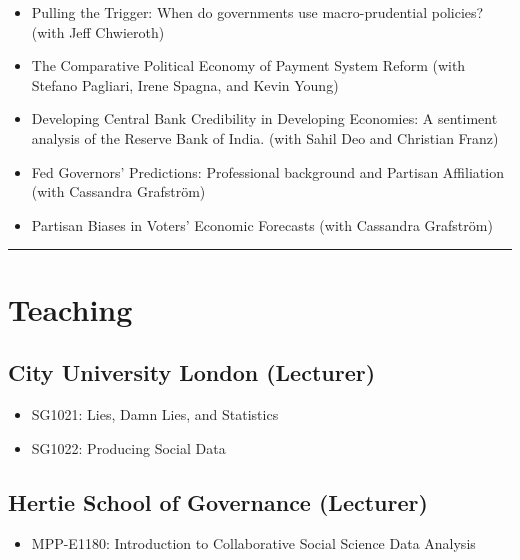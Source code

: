\documentclass[a4paper]{article}
\begin{document}
{\begin{itemize}
    \item Pulling the Trigger: When do governments use macro-prudential policies? (with Jeff Chwieroth)

    \item The Comparative Political Economy of Payment System Reform (with Stefano Pagliari, Irene Spagna, and Kevin Young)

    \item Developing Central Bank Credibility in Developing Economies: A sentiment
    analysis of the Reserve Bank of India. (with Sahil Deo and Christian Franz)

    \item Fed Governors' Predictions: Professional background and Partisan Affiliation (with Cassandra Grafstr\"{o}m)

    \item Partisan Biases in Voters' Economic Forecasts (with Cassandra Grafstr\"{o}m)

\end{itemize}


\vspace{0.25cm}
\medskip\hrule height 1pt
\vspace{0.5cm}

\section*{Teaching}

\subsection*{City University London (Lecturer)}

\begin{itemize}
    \item SG1021: Lies, Damn Lies, and Statistics

    \item SG1022: Producing Social Data
\end{itemize}

\subsection*{Hertie School of Governance (Lecturer)}

\begin{itemize}

    \item MPP-E1180: Introduction to Collaborative Social Science Data Analysis


\end{itemize}}
\end{document}
